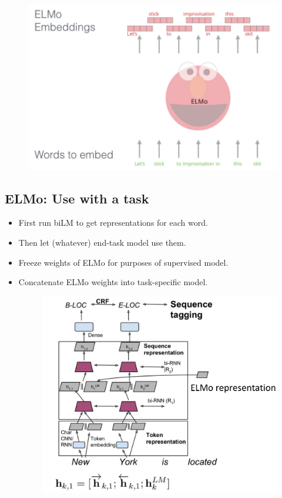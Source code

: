     \begin{figure}[h]
        	\includegraphics[scale = 0.29]{pics/elmo.png}
        \end{figure}  



\subsection{ELMo: Use with a task}
\begin{itemize}
\item First run biLM to get representations for each word.
\item Then let (whatever) end-task model use them.
\item  Freeze weights of ELMo for purposes of supervised model.
\item  Concatenate ELMo weights into task-specific model.


    \begin{figure}[h]
        	\includegraphics[scale = 0.25]{pics/elmo2.png}
        \end{figure}  

 

\end{itemize}

